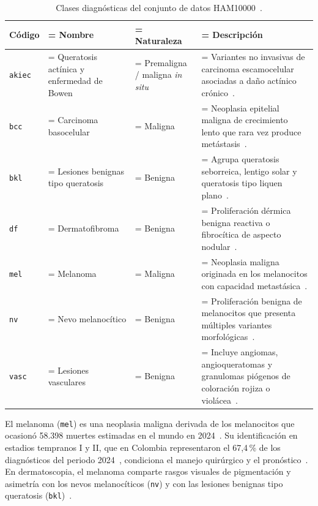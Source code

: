 \begin{table}[H]
  \centering
  \caption{Clases diagnósticas del conjunto de datos HAM10000~\cite{tschandl2018ham10000}.}
  \label{tab:clases}
  \begin{tabularx}{\textwidth}{l >{\hsize\linewidth=\hsize}Y >{\hsize\linewidth=\hsize}Y >{\hsize\linewidth=\hsize}Y}
    \toprule
    Código & Nombre & Naturaleza & Descripción \\
    \midrule
    \texttt{akiec} & Queratosis actínica y enfermedad de Bowen & Premaligna / maligna \textit{in situ} & Variantes no invasivas de carcinoma escamocelular asociadas a daño actínico crónico~\cite{tschandl2018ham10000}. \\
    \texttt{bcc} & Carcinoma basocelular & Maligna & Neoplasia epitelial maligna de crecimiento lento que rara vez produce metástasis~\cite{tschandl2018ham10000}. \\
    \texttt{bkl} & Lesiones benignas tipo queratosis & Benigna & Agrupa queratosis seborreica, lentigo solar y queratosis tipo liquen plano~\cite{tschandl2018ham10000}. \\
    \texttt{df} & Dermatofibroma & Benigna & Proliferación dérmica benigna reactiva o fibrocítica de aspecto nodular~\cite{tschandl2018ham10000}. \\
    \texttt{mel} & Melanoma & Maligna & Neoplasia maligna originada en los melanocitos con capacidad metastásica~\cite{tschandl2018ham10000,amaral2025esmo}. \\
    \texttt{nv} & Nevo melanocítico & Benigna & Proliferación benigna de melanocitos que presenta múltiples variantes morfológicas~\cite{tschandl2018ham10000}. \\
    \texttt{vasc} & Lesiones vasculares & Benigna & Incluye angiomas, angioqueratomas y granulomas piógenos de coloración rojiza o violácea~\cite{tschandl2018ham10000}. \\
    \bottomrule
  \end{tabularx}
\end{table}

El melanoma (\texttt{mel}) es una neoplasia maligna derivada de los melanocitos que ocasionó 58.398 muertes estimadas en el mundo en 2024~\cite{iarc2026melanoma,tschandl2018ham10000}. Su identificación en estadios tempranos I y II, que en Colombia representaron el 67,4\,\% de los diagnósticos del periodo 2024~\cite{cac2025melanoma}, condiciona el manejo quirúrgico y el pronóstico~\cite{amaral2025esmo}. En dermatoscopia, el melanoma comparte rasgos visuales de pigmentación y asimetría con los nevos melanocíticos (\texttt{nv}) y con las lesiones benignas tipo queratosis (\texttt{bkl})~\cite{tschandl2018ham10000}.

